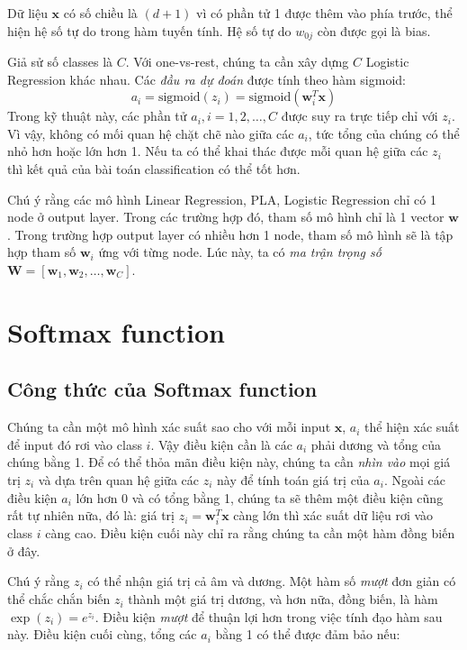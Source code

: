 Dữ liệu $\mathbf{x}$ có số chiều là $(d +1)$ vì có phần tử 1 được thêm vào phía trước, thể hiện hệ số tự do trong hàm tuyến tính. Hệ số tự do $w_{0j}$ còn được gọi là bias.  
 
Giả sử số classes là $C$. Với one-vs-rest, chúng ta cần xây dựng $C$ Logistic Regression khác nhau. Các \textit{đầu ra dự đoán} được tính theo hàm sigmoid: 
\begin{equation*} 
a_i = \text{sigmoid}(z_i) = \text{sigmoid}(\mathbf{w}_i^T\mathbf{x}) 
\end{equation*} 
Trong kỹ thuật này, các phần tử $a_i, i = 1, 2, \dots, C$ được suy ra trực tiếp chỉ với $z_i$. Vì vậy, không có mối quan hệ chặt chẽ nào giữa các $a_i$, tức tổng của chúng có thể nhỏ hơn hoặc lớn hơn 1. Nếu ta có thể khai thác được mỗi quan hệ giữa các $z_i$ thì kết quả của bài toán classification có thể tốt hơn.  
 
Chú ý rằng các mô hình Linear Regression, PLA, Logistic Regression chỉ có 1 node ở output layer. Trong các trường hợp đó, tham số mô hình chỉ là 1 vector $\mathbf{w}$. Trong trường hợp output layer có nhiều hơn 1 node, tham số mô hình sẽ là tập hợp  
tham số $\mathbf{w}_i$ ứng với từng node. Lúc này, ta có \textit{ma trận trọng số} $\mathbf{W} = [\mathbf{w}_1, \mathbf{w}_2, \dots, \mathbf{w}_C]$. 
 
 
\section{Softmax function }
 
\subsection{Công thức của Softmax function}
Chúng ta cần một mô hình xác suất sao cho với mỗi input $\mathbf{x}$, $a_i$ thể hiện xác suất để input đó rơi vào class $i$. Vậy điều kiện cần là các $a_i$ phải dương và tổng của chúng bằng 1. Để có thể thỏa mãn điều kiện này, chúng ta cần \textit{nhìn vào} mọi giá trị $z_i$ và dựa trên quan hệ giữa các $z_i$ này để tính toán giá trị của $a_i$. Ngoài các điều kiện $a_i$ lớn hơn 0 và có tổng bằng 1, chúng ta sẽ thêm một điều kiện cũng rất tự nhiên nữa, đó là: giá trị $z_i = \mathbf{w}_i^T\mathbf{x}$ càng lớn thì xác suất dữ liệu rơi vào class $i$ càng cao. Điều kiện cuối này chỉ ra rằng chúng ta cần một hàm đồng biến ở đây. 
 
Chú ý rằng $z_i $ có thể nhận giá trị cả âm và dương. Một hàm số \textit{mượt} đơn giản có thể chắc chắn biến  $z_i $ thành một giá trị dương, và hơn nữa, đồng biến, là hàm $\exp(z_i) = e^{z_i}$. Điều kiện \textit{mượt} để thuận lợi hơn trong việc tính đạo hàm sau này. Điều kiện cuối cùng, tổng các $a_i$ bằng 1 có thể được đảm bảo nếu: 
 

